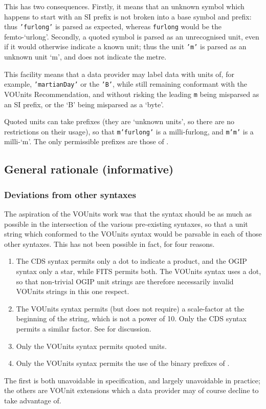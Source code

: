 \documentclass[11pt,a4paper]{ivoa}
\newcommand{\unit}[1]{\texttt{\small\color{orange}#1}}
\begin{document}
This has two consequences.  Firstly, it means that an unknown symbol
which happens to start with an SI prefix is not broken
into a base symbol and prefix: thus \unit{'furlong'} is parsed as
expected, whereas \unit{furlong} would be the femto-`urlong'.
Secondly, a quoted symbol is parsed as an unrecognised unit, even if
it would otherwise indicate a known unit; thus the unit \unit{'m'} is
parsed as an unknown unit `m', and does not indicate the metre.

This facility means that a data provider may label data with units of,
for example, \unit{'martianDay'} or the \unit{'B'}, while still
remaining conformant with the VOUnits Recommendation, and without
risking the leading \texttt{m} being misparsed as an SI prefix, or the
`B' being misparsed as a `byte'.

Quoted units can take prefixes (they are `unknown units', so there are
no restrictions on their usage), so that \unit{m'furlong'} is a
milli-furlong, and \unit{m'm'} is a milli-`m'.  The only permissible
prefixes are those of .

\subsection{General rationale (informative)}
\label{sec:rationale}

\subsubsection{Deviations from other syntaxes}
\label{sec:deviations}

The aspiration of the VOUnits work was that the syntax should be as
much as possible in the intersection of the various pre-existing
syntaxes, so that a unit string which conformed to the VOUnits syntax
would be parsable in each of those other syntaxes.  This has not been
possible in fact, for four reasons.
\begin{enumerate}
\item The CDS syntax permits only a dot to indicate a product, and the
OGIP syntax only a star, while FITS permits both.  The VOUnits syntax
uses a dot, so that non-trivial OGIP unit strings are therefore
necessarily invalid VOUnits strings in this one respect.
\item The VOUnits syntax permits (but does not require) a scale-factor
at the beginning of the string, which is not a power of 10.  Only the
CDS syntax permits a similar factor.
See  for discussion.
\item Only the VOUnits syntax permits quoted units.
\item Only the VOUnits syntax permits the use of the binary prefixes
of .
\end{enumerate}
The first is both unavoidable in specification, and largely
unavoidable in practice; the others are VOUnit extensions which a data
provider may of course decline to take advantage of.
\end{document}
